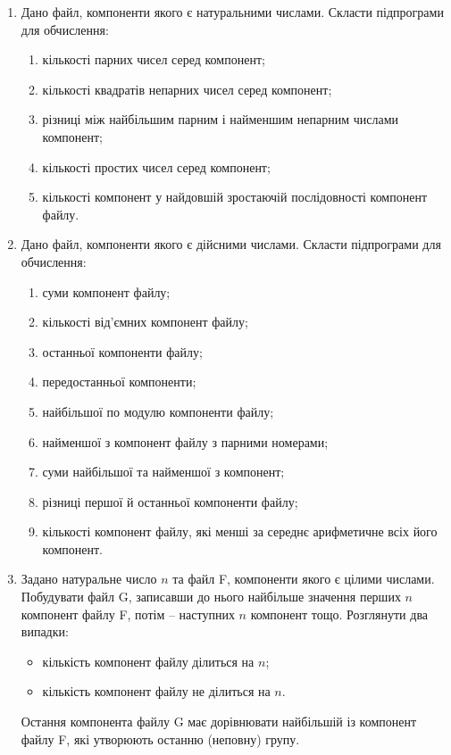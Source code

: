 \documentclass[a5paper,titlepage,openany,twoside,draft]{book_unv}%
\makeatletter
\newcommand{\xslalph}[1]{\expandafter\@xslalph\csname c@#1\endcsname}
\newcommand{\@xslalph}[1]{%
    \ifcase#1\or а\or б\or в\or г\or д\or e\or є\or ж\or з\or i%
    \or й\or к\or л\or м\or н\or о\or п\or р\or с\or т%
    \or у\or ф\or х\or ц\or ч\or ш\or ю\or я\or аа\or бб\or вв%
    \else\@ctrerr\fi%
}
\makeatother
\begin{document}
\begin{enumerate}
\def\labelenumi{\arabic{enumi})}
\setcounter{enumi}{5}
\item
  Дано файл, компоненти якого є натуральними числами. Скласти
  підпрограми для обчислення:
\begin{enumerate}[label=\xslalph*)]
\item
кількості парних чисел серед компонент;
\item
кількості квадратів непарних чисел серед компонент;
\item
різниці між найбільшим парним і найменшим непарним числами компонент;
\item
кількості простих чисел серед компонент;
\item  
кількості компонент у найдовшій зростаючій послідовності компонент
файлу.
\end{enumerate}

\item
  Дано файл, компоненти якого є дійсними числами. Скласти підпрограми
  для обчислення:
\begin{enumerate}[label=\xslalph*)]
\item
суми компонент файлу;
\item
кількості від'ємних компонент файлу;
\item
останньої компоненти файлу;
\item
передостанньої компоненти;
\item 
найбільшої по модулю компоненти файлу;
\item
найменшої з компонент файлу з парними номерами;
\item 
суми найбільшої та найменшої з компонент;
\item
різниці першої й останньої компоненти файлу;
\item
кількості компонент файлу, які менші за середнє арифметичне всіх його
компонент.
\end{enumerate}


\item
  Задано натуральне число $n$ та файл F, компоненти якого є цілими
  числами. Побудувати файл G, записавши до нього найбільше значення
  перших $n$ компонент файлу F, потім -- наступних $n$ компонент тощо.
  Розглянути два випадки:
\begin{itemize}
\item
кількість компонент файлу ділиться на $n$;
\item
кількість компонент файлу не ділиться на $n$. 
\end{itemize}
Остання компонента файлу G має дорівнювати найбільшій із компонент 
файлу F, які утворюють останню (неповну) групу.


\end{enumerate}
\end{document}
